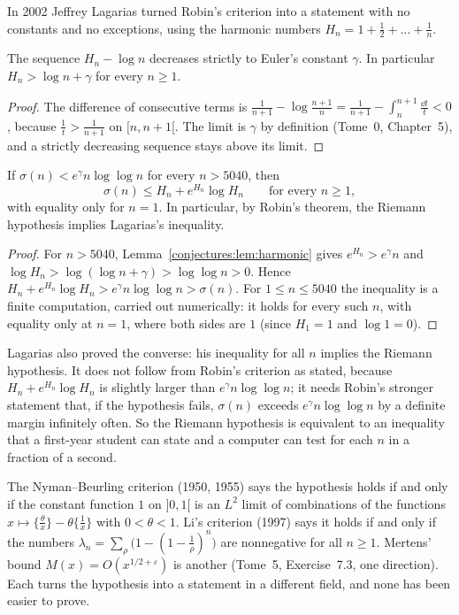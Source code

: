 In 2002 Jeffrey Lagarias turned Robin's criterion into a statement with no constants and no exceptions, using the harmonic numbers
$H_n=1+\frac12+\dots+\frac1n$.

\begin{lemma}\label{conjectures:lem:harmonic}
The sequence $H_n-\log n$ decreases strictly to Euler's constant $\gamma$. In particular $H_n>\log n+\gamma$ for every $n\ge1$.
\end{lemma}
\begin{proof}
The difference of consecutive terms is $\frac1{n+1}-\log\frac{n+1}n=\frac1{n+1}-\int_n^{n+1}\frac{\dd t}t<0$, because $\frac1t>\frac1{n+1}$ on $[n,n+1[$. The limit is $\gamma$
by definition (Tome~0, Chapter~5), and a strictly decreasing sequence stays above its limit.
\end{proof}

\begin{proposition}\label{conjectures:prop:lagarias}
If $\sigma(n)<e^\gamma n\log\log n$ for every $n>5040$, then
\[
\sigma(n)\le H_n+e^{H_n}\log H_n\qquad\text{for every }n\ge1,
\]
with equality only for $n=1$. In particular, by Robin's theorem, the Riemann hypothesis implies Lagarias's inequality.
\end{proposition}
\begin{proof}
For $n>5040$, Lemma~\ref{conjectures:lem:harmonic} gives $e^{H_n}>e^\gamma n$ and $\log H_n>\log(\log n+\gamma)>\log\log n>0$. Hence
$H_n+e^{H_n}\log H_n>e^\gamma n\log\log n>\sigma(n)$. For $1\le n\le5040$ the inequality is a finite computation, carried out numerically: it holds
for every such $n$, with equality only at $n=1$, where both sides are $1$ (since $H_1=1$ and $\log1=0$).
\end{proof}

Lagarias also proved the converse: his inequality for all $n$ implies the Riemann hypothesis. It does not follow from Robin's criterion as stated,
because $H_n+e^{H_n}\log H_n$ is slightly larger than $e^\gamma n\log\log n$; it needs Robin's stronger statement that, if the hypothesis fails,
$\sigma(n)$ exceeds $e^\gamma n\log\log n$ by a definite margin infinitely often. So the Riemann hypothesis is equivalent to an inequality that a
first-year student can state and a computer can test for each $n$ in a fraction of a second.

\begin{remark}
The Nyman--Beurling criterion (1950, 1955) says the hypothesis holds if and only if the constant function $1$ on $]0,1[$ is an $L^2$ limit of
combinations of the functions $x\mapsto\{\frac\theta x\}-\theta\{\frac1x\}$ with $0<\theta<1$. Li's criterion (1997) says it holds if and only if the numbers
$\lambda_n=\sum_\rho\bigl(1-(1-\frac1\rho)^n\bigr)$ are nonnegative for all $n\ge1$. Mertens' bound $M(x)=O(x^{1/2+\varepsilon})$ is another (Tome~5,
Exercise~7.3, one direction). Each turns the hypothesis into a statement in a different field, and none has been easier to prove.
\end{remark}

